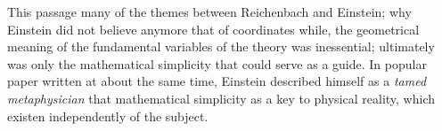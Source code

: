 \documentclass[draft]{article}
\begin{document}
This passage many of the themes between Reichenbach and Einstein; why Einstein did not believe anymore that of coordinates while, the geometrical meaning of the fundamental variables of the theory was inessential; ultimately was only the mathematical simplicity that could serve as a guide. In popular paper written at about the same time, Einstein described himself as a \emph{tamed metaphysician}  \citep[13]{Einstein1950c} that mathematical simplicity as a key to physical reality, which existen independently of the subject.  








\end{document}
